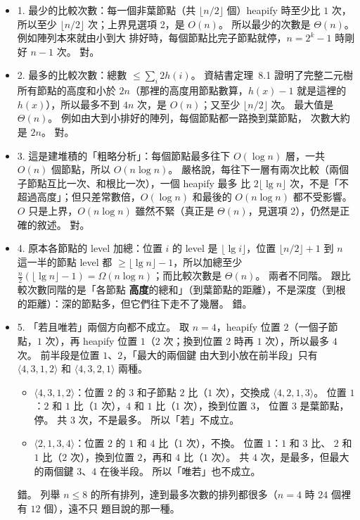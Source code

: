 \begin{pastsoln}
\begin{itemize}
\item 1. 最少的比較次數：每一個非葉節點（共 $\lfloor n/2 \rfloor$ 個）heapify 時至少比 $1$ 次，所以至少
$\lfloor n/2 \rfloor$ 次；上界見選項 2，是 $O(n)$。 所以最少的次數是 $\Theta(n)$。 例如陣列本來就由小到大
排好時，每個節點比完子節點就停，$n = 2^k - 1$ 時剛好 $n - 1$ 次。 對。
\item 2. 最多的比較次數：總數 $\le \sum_i 2h(i)$。 資結書定理~8.1 證明了完整二元樹所有節點的高度和小於
$2n$（那裡的高度用節點數算，$h(x) - 1$ 就是這裡的 $h(x)$），所以最多不到 $4n$ 次，是 $O(n)$；又至少
$\lfloor n/2 \rfloor$ 次。 最大值是 $\Theta(n)$。 例如由大到小排好的陣列，每個節點都一路換到葉節點，
次數大約是 $2n$。 對。
\item 3. 這是建堆積的「粗略分析」：每個節點最多往下 $O(\log n)$ 層，一共 $O(n)$ 個節點，所以
$O(n \log n)$。 嚴格說，每往下一層有兩次比較（兩個子節點互比一次、和根比一次），一個 heapify 最多
比 $2\lfloor \lg n \rfloor$ 次，不是「不超過高度」；但只差常數倍，$O(\log n)$ 和最後的 $O(n \log n)$
都不受影響。 $O$ 只是上界，$O(n \log n)$ 雖然不緊（真正是 $\Theta(n)$，見選項 2），仍然是正確的敘述。
對。
\item 4. 原本各節點的 level 加總：位置 $i$ 的 level 是 $\lfloor \lg i \rfloor$，位置 $\lfloor n/2 \rfloor + 1$
到 $n$ 這一半的節點 level 都 $\ge \lfloor \lg n \rfloor - 1$，所以加總至少 $\frac{n}{2}(\lfloor \lg n
\rfloor - 1) = \Omega(n \log n)$；而比較次數是 $\Theta(n)$。 兩者不同階。 跟比較次數同階的是「各節點
\textbf{高度}的總和」（到葉節點的距離），不是深度（到根的距離）：深的節點多，但它們往下走不了幾層。 錯。
\item 5. 「若且唯若」兩個方向都不成立。 取 $n = 4$，heapify 位置 $2$（一個子節點，$1$ 次），再 heapify
位置 $1$（$2$ 次；換到位置 $2$ 時再 $1$ 次），所以最多 $4$ 次。 前半段是位置 $1$、$2$，「最大的兩個鍵
由大到小放在前半段」只有 $\langle 4, 3, 1, 2\rangle$ 和 $\langle 4, 3, 2, 1\rangle$ 兩種。
\begin{itemize}
\item $\langle 4, 3, 1, 2\rangle$：位置 $2$ 的 $3$ 和子節點 $2$ 比（$1$ 次），交換成
$\langle 4, 2, 1, 3\rangle$。 位置 $1$：$2$ 和 $1$ 比（$1$ 次），$4$ 和 $1$ 比（$1$ 次），換到位置 $3$，
位置 $3$ 是葉節點，停。 共 $3$ 次，不是最多。 所以「若」不成立。
\item $\langle 2, 1, 3, 4\rangle$：位置 $2$ 的 $1$ 和 $4$ 比（$1$ 次），不換。 位置 $1$：$1$ 和 $3$ 比、
$2$ 和 $1$ 比（$2$ 次），換到位置 $2$，再和 $4$ 比（$1$ 次）。 共 $4$ 次，是最多，但最大的兩個鍵
$3$、$4$ 在後半段。 所以「唯若」也不成立。
\end{itemize}
錯。 列舉 $n \le 8$ 的所有排列，達到最多次數的排列都很多（$n = 4$ 時 $24$ 個裡有 $12$ 個），遠不只
題目說的那一種。
\end{itemize}
\end{pastsoln}
